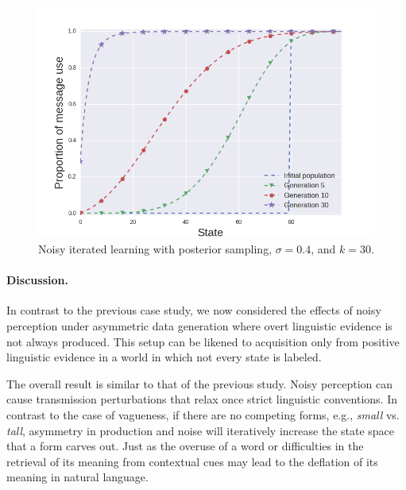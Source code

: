 \documentclass[10pt,a4paper]{article}
\begin{document}
\begin{figure}[ht]
\centering
    \includegraphics[scale=0.4]{../code/plots/deflation-sigma04.png}
  \caption{Noisy iterated learning with posterior sampling, $\sigma = 0.4$, and $k = 30$.}
  \label{fig:defl}
\end{figure}

\paragraph{Discussion.} In contrast to the previous case study, we now considered the effects of noisy perception under asymmetric data generation where overt linguistic evidence is not always produced. This setup can be likened to acquisition only from positive linguistic evidence in a world in which not every state is labeled. %

The overall result is similar to that of the previous study. Noisy perception can cause transmission perturbations that relax once strict linguistic conventions. In contrast to the case of vagueness, if there are no competing forms, e.g., {\em small} vs. {\em tall}, asymmetry in production and noise will iteratively increase the state space that a form carves out. Just as the overuse of a word or difficulties in the retrieval of its meaning from contextual cues may lead to the deflation of its meaning in natural language.
\end{document}
